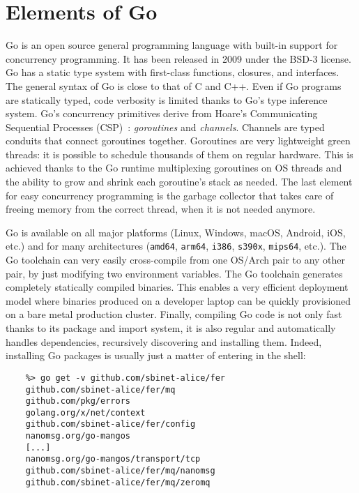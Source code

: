 \documentclass{webofc}
\begin{document}
\section{Elements of Go}
\label{sec-intro-go}
Go is an open source general programming language with built-in support for concurrency programming.
It has been released in 2009 under the BSD-3 license.
Go has a static type system with first-class functions, closures, and interfaces.
The general syntax of Go is close to that of C and C++.
Even if Go programs are statically typed, code verbosity is limited thanks to Go's type inference system.
Go's concurrency primitives derive from Hoare's Communicating Sequential Processes (CSP)~\cite{ref-csp}: \emph{goroutines} and \emph{channels}.
Channels are typed conduits that connect goroutines together.
Goroutines are very lightweight green threads: it is possible to schedule thousands of them on regular hardware.
This is achieved thanks to the Go runtime multiplexing goroutines on OS threads and the ability to grow and shrink each goroutine's stack as needed.
The last element for easy concurrency programming is the garbage collector that takes care of freeing memory from the correct thread, when it is not needed anymore.

Go is available on all major platforms (Linux, Windows, macOS, Android, iOS, etc.) and for many architectures (\texttt{amd64}, \texttt{arm64}, \texttt{i386}, \texttt{s390x}, \texttt{mips64}, etc.).
The Go toolchain can very easily cross-compile from one OS/Arch pair to any other pair, by just modifying two environment variables.
The Go toolchain generates completely statically compiled binaries.
This enables a very efficient deployment model where binaries produced on a developer laptop can be quickly provisioned on a bare metal production cluster.
Finally, compiling Go code is not only fast thanks to its package and import system, it is also regular and automatically handles dependencies, recursively discovering and installing them.
Indeed, installing Go packages is usually just a matter of entering in the shell:

\begin{verbatim}
	%> go get -v github.com/sbinet-alice/fer
	github.com/sbinet-alice/fer/mq
	github.com/pkg/errors
	golang.org/x/net/context
	github.com/sbinet-alice/fer/config
	nanomsg.org/go-mangos
	[...]
	nanomsg.org/go-mangos/transport/tcp
	github.com/sbinet-alice/fer/mq/nanomsg
	github.com/sbinet-alice/fer/mq/zeromq
\end{verbatim}
\end{document}

